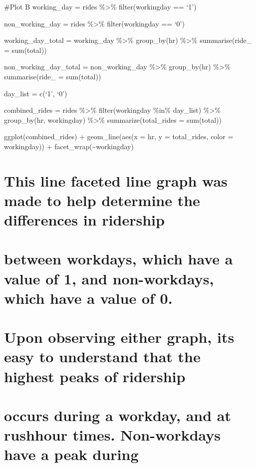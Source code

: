 \documentclass[
]{article}
\begin{document}
\#Plot B working\_day = rides \%\textgreater\% filter(workingday == `1')

non\_working\_day = rides \%\textgreater\% filter(workingday == `0')

working\_day\_total = working\_day \%\textgreater\% group\_by(hr)
\%\textgreater\% summarise(ride\_ = sum(total))

non\_working\_day\_total = non\_working\_day \%\textgreater\%
group\_by(hr) \%\textgreater\% summarise(ride\_ = sum(total))

day\_list = c(`1', `0')

combined\_rides = rides \%\textgreater\% filter(workingday \%in\%
day\_list) \%\textgreater\% group\_by(hr, workingday) \%\textgreater\%
summarize(total\_rides = sum(total))

ggplot(combined\_rides) + geom\_line(aes(x = hr, y = total\_rides, color
= workingday)) + facet\_wrap(\textasciitilde workingday)

\hypertarget{this-line-faceted-line-graph-was-made-to-help-determine-the-differences-in-ridership}{%
\section{This line faceted line graph was made to help determine the
differences in
ridership}\label{this-line-faceted-line-graph-was-made-to-help-determine-the-differences-in-ridership}}

\hypertarget{between-workdays-which-have-a-value-of-1-and-non-workdays-which-have-a-value-of-0.}{%
\section{between workdays, which have a value of 1, and non-workdays,
which have a value of
0.}\label{between-workdays-which-have-a-value-of-1-and-non-workdays-which-have-a-value-of-0.}}

\hypertarget{upon-observing-either-graph-its-easy-to-understand-that-the-highest-peaks-of-ridership}{%
\section{Upon observing either graph, its easy to understand that the
highest peaks of
ridership}\label{upon-observing-either-graph-its-easy-to-understand-that-the-highest-peaks-of-ridership}}

\hypertarget{occurs-during-a-workday-and-at-rushhour-times.-non-workdays-have-a-peak-during}{%
\section{occurs during a workday, and at rushhour times. Non-workdays
have a peak
during}\label{occurs-during-a-workday-and-at-rushhour-times.-non-workdays-have-a-peak-during}}
\end{document}
